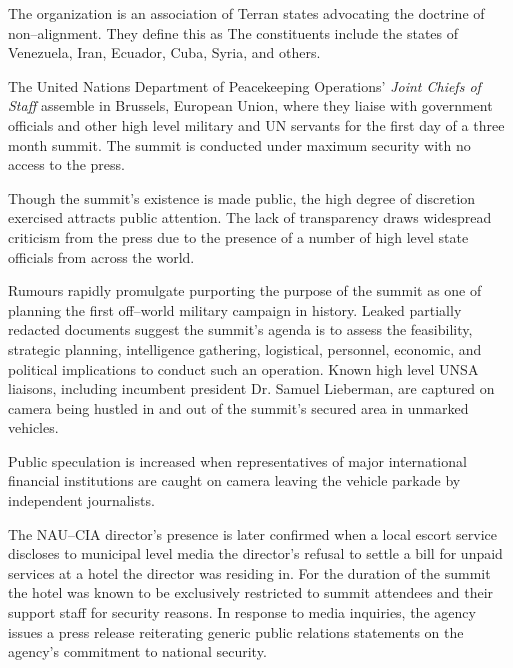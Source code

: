 The organization is an association of Terran states advocating the doctrine of non--alignment. They define this as  The constituents include the states of Venezuela, Iran, Ecuador, Cuba, Syria, and others.
\StopTimelineDate

The United Nations Department of Peacekeeping Operations' {\it Joint Chiefs of Staff} assemble in Brussels, European Union, where they liaise with government officials and other high level military and UN servants for the first day of a three month summit. The summit is conducted under maximum security with no access to the press.

Though the summit's existence is made public, the high degree of discretion exercised attracts public attention. The lack of transparency draws widespread criticism from the press due to the presence of a number of high level state officials from across the world.

Rumours rapidly promulgate purporting the purpose of the summit as one of planning the first off--world military campaign in history. Leaked partially redacted documents suggest the summit's agenda is to assess the feasibility, strategic planning, intelligence gathering, logistical, personnel, economic, and political implications to conduct such an operation. Known high level UNSA liaisons, including incumbent president Dr. Samuel Lieberman, are captured on camera being hustled in and out of the summit's secured area in unmarked vehicles.

Public speculation is increased when representatives of major international financial institutions are caught on camera leaving the vehicle parkade by independent journalists. 

The NAU--CIA director's presence is later confirmed when a local escort service discloses to municipal level media the director's refusal to settle a bill for unpaid services at a hotel the director was residing in. For the duration of the summit the hotel was known to be exclusively restricted to summit attendees and their support staff for security reasons. In response to media inquiries, the agency issues a press release reiterating generic public relations statements on the agency's commitment to national security.
\StopTimelineDate


